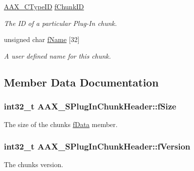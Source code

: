 \begin{DoxyCompactItemize}
\hyperlink{a00149_ac678f9c1fbcc26315d209f71a147a175}{A\+A\+X\+\_\+\+C\+Type\+I\+D} \hyperlink{a00126_a01307400067d1777c304624ffb5e0a8c}{f\+Chunk\+I\+D}
\begin{DoxyCompactList}\small\item\em The I\+D of a particular Plug-\/\+In chunk. \end{DoxyCompactList}\item 
unsigned char \hyperlink{a00126_a84bee19fce5aeb2c429d872430cb8dab}{f\+Name} \mbox{[}32\mbox{]}
\begin{DoxyCompactList}\small\item\em A user defined name for this chunk. \end{DoxyCompactList}\end{DoxyCompactItemize}


\subsection{Member Data Documentation}
\hypertarget{a00126_abaea87174a6d0dd1260644f6440591a6}{}
\subsubsection[{f\+Size}]{\setlength{\rightskip}{0pt plus 5cm}int32\+\_\+t A\+A\+X\+\_\+\+S\+Plug\+In\+Chunk\+Header\+::f\+Size}\label{a00126_abaea87174a6d0dd1260644f6440591a6}


The size of the chunk\textquotesingle{}s \hyperlink{a00125_abc76d66fffa4a59ee5cfdbdd992c532c}{f\+Data} member. 

\hypertarget{a00126_a543b3299cad8fd9a4de599d97a069a35}{}
\subsubsection[{f\+Version}]{\setlength{\rightskip}{0pt plus 5cm}int32\+\_\+t A\+A\+X\+\_\+\+S\+Plug\+In\+Chunk\+Header\+::f\+Version}\label{a00126_a543b3299cad8fd9a4de599d97a069a35}


The chunk\textquotesingle{}s version. 

